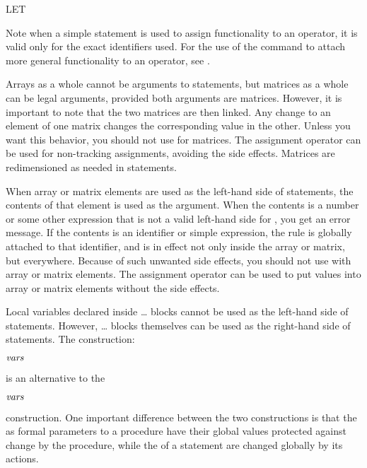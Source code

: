 \begin{Command}{LET}
\begin{Comments}
Note when a simple  statement is used to assign functionality to an
operator, it is valid only for the exact identifiers used.  For the use of the 
 command to attach more general functionality to an operator,
see .

Arrays as a whole cannot be arguments to  statements, but
matrices as a whole can be legal arguments, provided both arguments are
matrices.  However, it is important to note that the two matrices are then
linked.  Any change to an element of one matrix changes the corresponding
value in the other.  Unless you want this behavior, you should not use
 for matrices.  The assignment operator  can be used
for non-tracking assignments, avoiding the side effects.  Matrices are
redimensioned as needed in  statements.

When array or matrix elements are used as the left-hand side of 
statements, the contents of that element is used as the argument.  When the 
contents is a number or some other expression that is not a valid left-hand 
side for , you get an error message.  If the contents is an
identifier or simple expression, the  rule is globally attached 
to that identifier, and is in effect not only inside the array or matrix, 
but everywhere.  Because of such unwanted side effects, you should not 
use  with array or matrix elements.  The assignment operator 
\name{:=} can be used to put values into array or matrix elements without 
the side effects.

Local variables declared inside \ldots{} blocks cannot
be used as the left-hand side of  statements.  However,
\ldots{} blocks themselves can be used as the
right-hand side of  statements.  The construction:
\begin{Syntax}
         
        \(\meta{vars}\)\name{=}
\end{Syntax}
is an alternative to the 
\begin{Syntax}
         \(\meta{vars}\)\name{;}
\end{Syntax}
construction.  One important difference between the two constructions is that
the  as formal parameters to a procedure have their global values
protected against change by the procedure, while the  of a 
 statement are changed globally by its actions. 


\end{Comments}
\end{Command}
